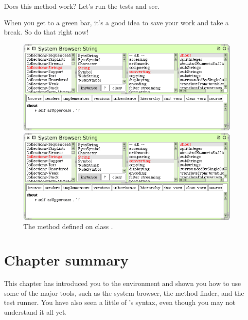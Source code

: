 \documentclass[a4paper,10pt,twoside]{book}
\begin{document}
Does this method work?  Let's run the tests and see.

When you get to a green bar\footnotemark, it's a good idea to save your work and take a break.  
So do that right now!

\begin{figure}[hbt]
\ifluluelse
	{\centerline{\includegraphics[width=\textwidth]{String-Shout}}}
	{\centerline{\includegraphics[scale=0.7]{String-Shout}}}
\caption{The  method defined on class .
\label{fig:String-shout}}
\end{figure}

\section{Chapter summary}
This chapter has introduced you to the \sq environment and shown you how to use some of the major tools, such as the system browser, the method finder, and the test runner.   You have also seen a little of \sq's syntax, even though you may not understand it all yet.
\end{document}
